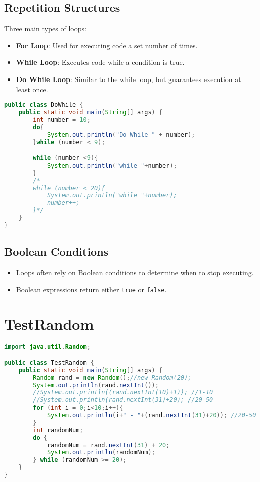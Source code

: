 \documentclass{article}
\begin{document}
\subsection{Repetition Structures}
Three main types of loops:
\begin{itemize}
    \item \textbf{For Loop}: Used for executing code a set number of times.
    \item \textbf{While Loop}: Executes code while a condition is true.
    \item \textbf{Do While Loop}: Similar to the while loop, but guarantees execution at least once.
\end{itemize}
\begin{lstlisting}[language=java]
    public class DoWhile {
    public static void main(String[] args) {
        int number = 10;
        do{
            System.out.println("Do While " + number);
        }while (number < 9);

        while (number <9){
            System.out.println("while "+number);
        }
        /*
        while (number < 20){
            System.out.println("while "+number);
            number++;
        }*/
    }
}
\end{lstlisting}

\subsection{Boolean Conditions}
\begin{itemize}
    \item Loops often rely on Boolean conditions to determine when to stop executing.
    \item Boolean expressions return either \texttt{true} or \texttt{false}.
\end{itemize}
\section{TestRandom}
\begin{lstlisting}[language=java]
import java.util.Random;

public class TestRandom {
    public static void main(String[] args) {
        Random rand = new Random();//new Random(20);
        System.out.println(rand.nextInt());
        //System.out.println((rand.nextInt(10)+1)); //1-10
        //System.out.println(rand.nextInt(31)+20); //20-50
        for (int i = 0;i<10;i++){
            System.out.println(i+" - "+(rand.nextInt(31)+20)); //20-50
        }
        int randomNum;
        do {
            randomNum = rand.nextInt(31) + 20;
            System.out.println(randomNum);
        } while (randomNum >= 20);
    }
}    
\end{lstlisting}
\end{document}
